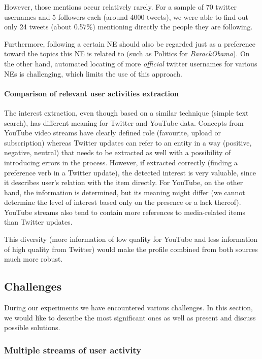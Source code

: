 However, those mentions occur relatively rarely. For a sample of 70 twitter usernames and 5 followers each
(around 4000 tweets), we were able to find out only 24 tweets (about 0.57\%) mentioning directly the people they are following.

Furthermore, following a certain NE should also be regarded just as a preference toward the topics this NE is related to (such as Politics for \textit{BarackObama}). On the other hand, automated locating of more \textit{official} twitter usernames for various NEs is challenging, which
limits the use of this approach.

\paragraph{Comparison of relevant user activities extraction}

The interest extraction, even though based on a similar technique (simple text
search), has different meaning for Twitter and YouTube data.  Concepts from
YouTube video streams have clearly defined role (favourite, upload or
subscription) whereas Twitter updates can refer to an entity in a way (positive,
negative, neutral) that needs to be extracted as well with a possibility of
introducing errors in the process. However, if extracted correctly (finding a
preference verb in a Twitter update), the detected interest is very valuable,
since it describes user's relation with the item directly. For YouTube, on the
other hand, the information is determined, but its meaning might differ (we
cannot determine the level of interest based only on the presence or a lack
thereof). YouTube streams also tend to contain more references to media-related
items than Twitter updates. 

This diversity (more information of low quality for YouTube and less
information of high quality from Twitter) would make the profile combined from
both sources much more robust.

\subsection{Challenges}

During our experiments we have encountered various challenges. In this section, we would like to describe
the most significant ones as well as present and discuss possible solutions.

\subsubsection{Multiple streams of user activity}

